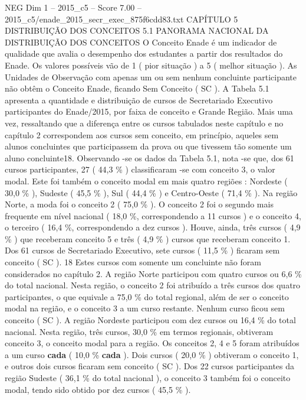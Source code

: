 \begin{textsample}{NEG Dim 1 – 2015\_c5 – Score 7.00 – 2015\_c5/enade\_2015\_secr\_exec\_875f6cdd83.txt}  \label{ex:f1_neg_347}
CAPÍTULO 5 DISTRIBUIÇÃO DOS CONCEITOS 5.1 PANORAMA NACIONAL DA DISTRIBUIÇÃO DOS CONCEITOS O Conceito Enade é um indicador de qualidade que avalia o desempenho dos estudantes a partir dos resultados do Enade.
Os valores possíveis vão de 1 ( pior situação ) a 5 ( melhor situação ).
As Unidades de Observação com apenas um ou sem nenhum concluinte participante não obtêm o Conceito Enade, ficando Sem Conceito ( SC ).
A Tabela 5.1 apresenta a quantidade e distribuição de cursos de Secretariado Executivo participantes do Enade/2015, por faixa de conceito e Grande Região.
Mais uma vez, ressaltando que a diferença entre os cursos tabulados neste capítulo e no capítulo 2 correspondem aos cursos sem conceito, em princípio, aqueles sem alunos concluintes que participassem da prova ou que tivessem tão somente um aluno concluinte18.
Observando -se os dados da Tabela 5.1, nota -se que, dos 61 cursos participantes, 27 ( 44,3 \% ) classificaram -se com conceito 3, o valor modal.
Este foi também o conceito modal em mais quatro regiões : Nordeste ( 30,0 \% ), Sudeste ( 45,5 \% ), Sul ( 44,4 \% ) e Centro-Oeste ( 71,4 \% ).
Na região Norte, a moda foi o conceito 2 ( 75,0 \% ).
O conceito 2 foi o segundo mais frequente em nível nacional ( 18,0 \%, correspondendo a 11 cursos ) e o conceito 4, o terceiro ( 16,4 \%, correspondendo a dez cursos ).
Houve, ainda, três cursos ( 4,9 \% ) que receberam conceito 5 e três ( 4,9 \% ) cursos que receberam conceito 1.
Dos 61 cursos de Secretariado Executivo, sete cursos ( 11,5 \% ) ficaram sem conceito ( SC ). 18 Estes cursos com somente um concluinte não foram considerados no capítulo 2.
A região Norte participou com quatro cursos ou 6,6 \% do total nacional.
Nesta região, o conceito 2 foi atribuído a três cursos dos quatro participantes, o que equivale a 75,0 \% do total regional, além de ser o conceito modal na região, e o conceito 3 a um curso restante.
Nenhum curso ficou sem conceito ( SC ).
A região Nordeste participou com dez cursos ou 16,4 \% do total nacional.
Nesta região, três cursos, 30,0 \% em termos regionais, obtiveram conceito 3, o conceito modal para a região.
Os conceitos 2, 4 e 5 foram atribuídos a um curso \textbf{cada} ( 10,0 \% \textbf{cada} ).
Dois cursos ( 20,0 \% ) obtiveram o conceito 1, e outros dois cursos ficaram sem conceito ( SC ).
Dos 22 cursos participantes da região Sudeste ( 36,1 \% do total nacional ), o conceito 3 também foi o conceito modal, tendo sido obtido por dez cursos ( 45,5 \% ).

\end{textsample}
